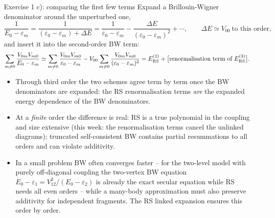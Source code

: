 \documentclass[aspectratio=169,10pt]{beamer}
\begin{document}
\begin{frame}[shrink=5]{Exercise 1 c): comparing the first few terms}
Expand a Brillouin-Wigner denominator around the unperturbed one,
\[
\frac{1}{E_0-\varepsilon_m}=\frac{1}{(\varepsilon_0-\varepsilon_m)+\Delta E}
=\frac{1}{\varepsilon_0-\varepsilon_m}-\frac{\Delta E}{(\varepsilon_0-\varepsilon_m)^2}+\cdots,
\qquad \Delta E\simeq V_{00}\ \text{to this order,}
\]
and insert it into the second-order BW term:
\[
\sum_{m\ne0}\frac{V_{0m}V_{m0}}{E_0-\varepsilon_m}
\simeq\sum_{m\ne0}\frac{V_{0m}V_{m0}}{\varepsilon_0-\varepsilon_m}
-V_{00}\sum_{m\ne0}\frac{V_{0m}V_{m0}}{(\varepsilon_0-\varepsilon_m)^2}
= E^{(2)}_{\rm RS}+\bigl[\text{renormalisation term of }E^{(3)}_{\rm RS}\bigr].
\]
\begin{itemize}
\item Through third order the two schemes agree term by term once the BW denominators are expanded: the RS renormalisation terms \emph{are} the expanded energy dependence of the BW denominators.
\item At a \emph{finite} order the difference is real: RS is a true polynomial in the coupling and size extensive (this week: the renormalisation terms cancel the unlinked diagrams); truncated self-consistent BW contains partial resummations to all orders and can violate additivity.
\item In a small problem BW often converges faster -- for the two-level model with purely off-diagonal coupling the two-vertex BW equation \(E_0-\varepsilon_1=V_{12}^2/(E_0-\varepsilon_2)\) is already the exact secular equation while RS needs all even orders -- while a many-body approximation must also preserve additivity for independent fragments. The RS linked expansion ensures this order by order.
\end{itemize}
\end{frame}
\end{document}
